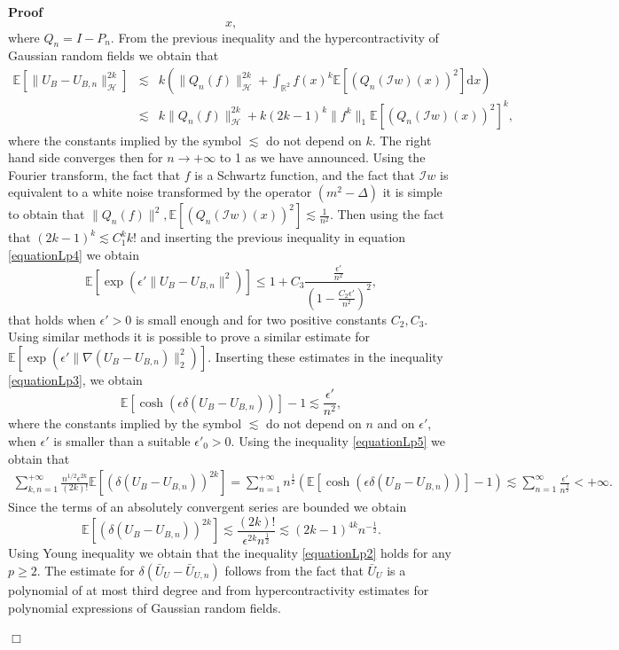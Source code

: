 \documentclass[a4paper,10pt]{article}
\newcommand{\mathd}{\mathrm{d}}
\newenvironment{proof}{\noindent\textbf{Proof\ }}{\hspace*{\fill}$\Box$\medskip}
\begin{document}
\begin{proof}
\[     x, \]
  where $Q_n = I - P_n$. From the previous inequality and the
  hypercontractivity of Gaussian random fields we obtain that
  \begin{eqnarray*}
    \mathbb{E} [\| U_B - U_{B, n} \|^{2 k}_{\mathcal{H}}] & \lesssim & k
    \left( \| Q_n (f) \|^{2 k}_{\mathcal{H}} + \int_{\mathbb{R}^2} f (x)^k
    \mathbb{E} [(Q_n (\mathcal{I}w) (x))^2] \mathd x \right)\\
    & \lesssim & k \| Q_n (f) \|^{2 k}_{\mathcal{H}} + k (2 k - 1)^k \| f^k
    \|_1 \mathbb{E} [(Q_n (\mathcal{I}w) (x))^2]^k,
  \end{eqnarray*}
  where the constants implied by the symbol $\lesssim$ do not depend on $k$.
  The right hand side converges then for $n \rightarrow + \infty$ to 1 as we
  have announced. Using the Fourier transform, the fact that $f$ is a Schwartz
  function, and the fact that $\mathcal{I}w$ is equivalent to a white noise
  transformed by the operator $(m^2 - \Delta)$ it is simple to obtain that $\|
  Q_n (f) \|^2, \mathbb{E} [(Q_n (\mathcal{I}w) (x))^2] \lesssim \frac{1}{n^2}
  .$ Then using the fact that $(2 k - 1)^k \lesssim C_1^k k!$ and inserting
  the previous inequality in equation {\eqref{equationLp4}} we obtain
  \[ \mathbb{E} [\exp (\epsilon' \| U_B - U_{B, n} \|^2)] \leqslant 1 + C_3
     \frac{\frac{\epsilon'}{n^2}}{\left( 1 - \frac{C_2 \epsilon'}{n^2}
     \right)^2}, \]
  that holds when $\epsilon' > 0$ is small enough and for two positive
  constants $C_2, C_3$. Using similar methods it is possible to prove a
  similar estimate for $\mathbb{E} [\exp (\epsilon' \| \nabla (U_B - U_{B, n})
  \|^2_2)]$. Inserting these estimates in the inequality
  {\eqref{equationLp3}}, we obtain
  \begin{equation}
    \mathbb{E} [\cosh (\epsilon \delta (U_B - U_{B, n}))] - 1 \lesssim
    \frac{\epsilon'}{n^2}, \label{equationLp5}
  \end{equation}
  where the constants implied by the symbol $\lesssim$ do not depend on $n$
  and on $\epsilon'$, when $\epsilon'$ is smaller than a suitable $\epsilon'_0
  > 0$. Using the inequality {\eqref{equationLp5}} we obtain that
  \begin{multline*}
    \sum_{k, n = 1}^{+ \infty} \frac{n^{1 / 2} \epsilon^{2 k}}{(2 k) !}
    \mathbb{E} [(\delta (U_B - U_{B, n}))^{2 k}] = \sum_{n = 1}^{+ \infty} n^{\frac{1}{2}} (\mathbb{E} [\cosh (\epsilon
    \delta (U_B - U_{B, n}))] - 1) \lesssim \sum_{n = 1}^{\infty}
    \frac{\epsilon'}{n^{\frac{3}{2}}} < + \infty .
  \end{multline*}
  Since the terms of an absolutely convergent series are bounded we obtain
  \[ \mathbb{E} [(\delta (U_B - U_{B, n}))^{2 k}] \lesssim \frac{(2 k)
     !}{\epsilon^{2 k} n^{\frac{1}{2}}} \lesssim (2 k - 1)^{4 k} n^{-
     \frac{1}{2}} . \]
  Using Young inequality we obtain that the inequality {\eqref{equationLp2}}
  holds for any $p \geqslant 2$. The estimate for $\delta (\bar{U}_U -
  \bar{U}_{U, n})$ follows from the fact that $\bar{U}_U$ is a polynomial of
  at most third degree and from hypercontractivity estimates for polynomial
  expressions of Gaussian random fields.
  

\end{proof}
\end{document}

